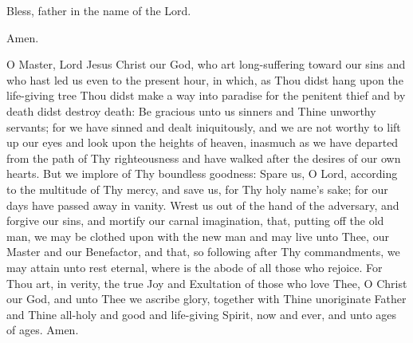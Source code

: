{%
\begin{reader}
\item \lhmThree
\item \gne
\item \morehonorablethanthetherubim
\item Bless, father in the name of the Lord.
\end{reader}







\vbox{}
\trisagionNeedsAmen{}

\begin{reader}
\item Amen.
\item \lhmTwelve
\end{reader}

\begin{maybetwocolumns}
O Master, Lord Jesus Christ our God, who art long-suffering toward our sins
and who hast led us even to the present hour, in which, as Thou didst hang
upon the life-giving tree Thou didst make a way into paradise for the penitent
thief and by death didst destroy death: Be gracious unto us sinners and Thine
unworthy servants; for we have sinned and dealt iniquitously, and we are not
worthy to lift up our eyes and look upon the heights of heaven, inasmuch as
we have departed from the path of Thy righteousness and have walked after the
desires of our own hearts. But we implore of Thy boundless goodness: Spare
us, O Lord, according to the multitude of Thy mercy, and save us, for Thy holy
name’s sake; for our days have passed away in vanity. Wrest us out of the
hand of the adversary, and forgive our sins, and mortify our carnal
imagination, that, putting off the old man, we may be clothed upon with the
new man and may live unto Thee, our Master and our Benefactor, and that, so
following after Thy commandments, we may attain unto rest eternal, where is
the abode of all those who rejoice. For Thou art, in verity, the true Joy and
Exultation of those who love Thee, O Christ our God, and unto Thee we ascribe
glory, together with Thine unoriginate Father and Thine all-holy and good and
life-giving Spirit, now and ever, and unto ages of ages. Amen.
\end{maybetwocolumns}
}

